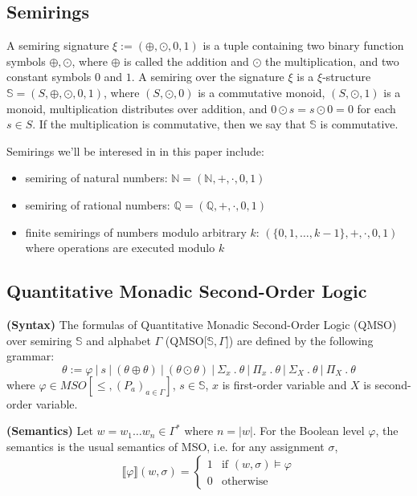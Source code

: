 \documentclass[12pt]{article}
\theoremstyle{definition}
\begin{document}
\subsection{Semirings}

A semiring signature $\xi := (\oplus, \odot, 0, 1)$ is a tuple containing two binary function symbols $\oplus, \odot$, where $\oplus$ is called the addition and $\odot$ the multiplication, and two constant symbols $0$ and $1$. A semiring over the signature $\xi$ is a $\xi$-structure $\mathbb{S} = (S, \oplus, \odot, 0, 1)$, where $(S, \odot, 0)$ is a commutative monoid, $(S, \odot, 1)$ is a monoid, multiplication distributes over addition, and $0 \odot s = s \odot 0 = 0$ for each $s \in S$. If the multiplication is commutative, then we say that $\mathbb{S}$ is commutative.

Semirings we'll be interesed in in this paper include:

\begin{itemize}
    \item semiring of natural numbers: $\mathbb{N} = (\mathbb{N}, +, \cdot, 0, 1)$
    \item semiring of rational numbers: $\mathbb{Q} = (\mathbb{Q}, +, \cdot, 0, 1)$
    \item finite semirings of numbers modulo arbitrary $k$: $(\{0,1,\ldots,k-1\}, +, \cdot, 0, 1)$ where operations are executed modulo $k$
\end{itemize}

\subsection{Quantitative Monadic Second-Order Logic}

\textbf{(Syntax)} The formulas of Quantitative Monadic Second-Order Logic (QMSO) over semiring $\mathbb{S}$ and alphabet $\Gamma$ (QMSO[$\mathbb{S}, \Gamma$]) are defined by the following grammar:
$$ \theta := \varphi \ | \ s \ | \ (\theta \oplus \theta) \ | \ (\theta \odot \theta) \ | \ \Sigma_x \ . \ \theta \ | \ \Pi_x \ . \ \theta \ | \ \Sigma_X \ . \ \theta \ | \ \Pi_X \ . \ \theta$$
where $\varphi \in MSO[\leq, (P_a)_{a \in \Gamma}]$, $s \in \mathbb{S}$, $x$ is first-order variable and $X$ is second-order variable.

\textbf{(Semantics)} Let $w 
= w_1 \dots w_n \in \Gamma^*$ where $n = |w|$. For the Boolean level $\varphi$, the semantics is the usual semantics of MSO, i.e. for any assignment $\sigma$,
\begin{equation*}
    \llbracket\varphi\rrbracket(w, \sigma) =
      \begin{cases}
        1 & \text{if $(w, \sigma) \models \varphi$}\\
        0 & \text{otherwise}
      \end{cases}       
\end{equation*}
\end{document}
